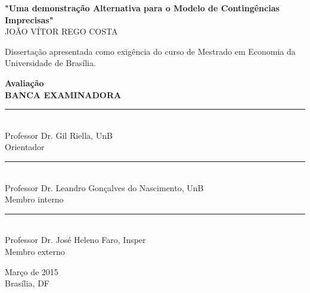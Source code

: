 \documentclass[12pt, a4paper]{article}
\theoremstyle{nonumberplain}
\theoremstyle{plain}
\theoremstyle{plain}
\theoremstyle{plain}
\theoremstyle{nonumberplain}
\begin{document}
\begin{titlepage}
\begin{center}
\textbf{"Uma demonstração Alternativa para o Modelo de Contingências Imprecisas"}\\
\vspace{1.5cm}
\uppercase{joão vítor rego costa}\\
\vspace{1cm}
\begin{flushright}
\begin{minipage}[c]{8cm}
Dissertação apresentada como exigência do curso de Mestrado em Economia da Universidade de Brasília.
\end{minipage}
\end{flushright}
\end{center}
\vspace{1.5cm}
\begin{flushleft}
\textbf{Avaliação}\\
\uppercase{\textbf{banca examinadorA}}\\
\vspace{1.5cm}
\rule{10cm}{.1pt}\\
Professor Dr. Gil Riella, UnB\\
Orientador\\
\vspace{1.5cm} 
\rule{10cm}{.1pt}\\
Professor Dr. Leandro Gonçalves do Nascimento, UnB\\
Membro interno\\
\vspace{1.5cm}
\rule{10cm}{.1pt}\\
Professor Dr. José Heleno Faro, Insper\\
Membro externo\\
\vfill

\begin{center}
Março de 2015\\ Brasília, DF 
\end{center}
\end{flushleft}

\end{titlepage}
\end{document}

